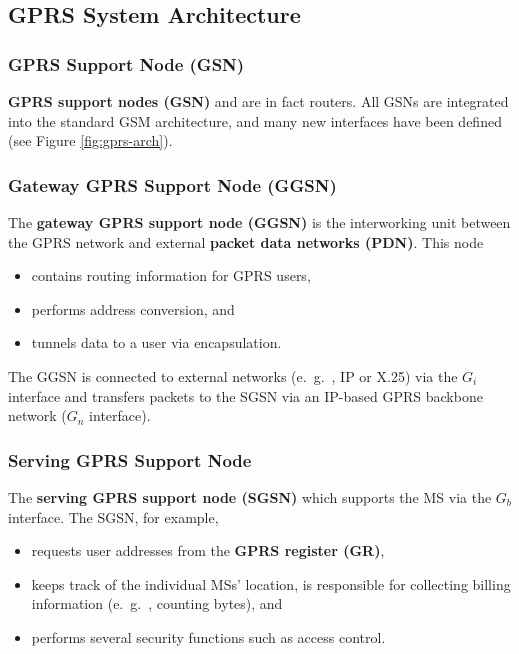 \subsection{GPRS System Architecture}

\subsubsection[GSN]{GPRS Support Node (GSN)}
\textbf{GPRS support nodes (GSN)} and are in fact routers. All GSNs are integrated into the standard GSM architecture, and many new interfaces have been defined (see Figure \ref{fig:gprs-arch}). 

\subsubsection[GGSN]{Gateway GPRS Support Node (GGSN)}
The \textbf{gateway GPRS support node (GGSN)} is the interworking unit between the GPRS network and external \textbf{packet data networks (PDN)}. This node
\begin{itemize}
	\item contains routing information for GPRS users, 
	\item performs address conversion, and 
	\item tunnels data to a user via encapsulation.
\end{itemize}
 The GGSN is connected to external networks (e.\ g.\ , IP or X.25) via the $ G_i $ interface and transfers packets to the SGSN via an IP-based GPRS backbone network ($ G_n $ interface).

\subsubsection[SGSN]{Serving GPRS Support Node}
The \textbf{serving GPRS support node (SGSN)} which supports the MS via the $ G_b $ interface. The SGSN, for example, 
\begin{itemize}
	\item requests user addresses from the \textbf{GPRS register (GR)}, 
	\item keeps track of the individual MSs' location, is responsible for collecting billing information (e.\ g.\ , counting bytes), and \item performs several security functions such as access control.
\end{itemize}


